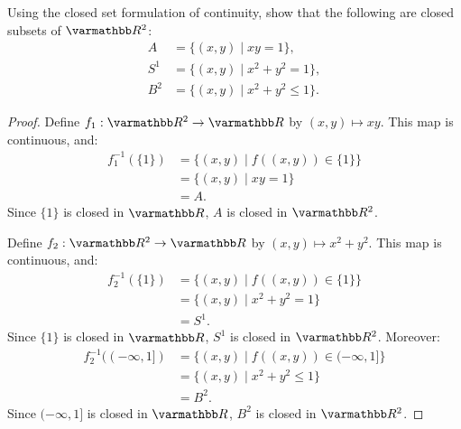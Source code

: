 \documentclass[12pt,twoside,openany]{memoir}
\begin{document}
\begin{exercise}[manual-num={10}]
Using the closed set formulation of continuity, show that the following are closed subsets of $\bfR^2$:
    \begin{equation*}
    \begin{split}
        A &= \{(x,y) \mid xy = 1\}, \\
        S^1 &= \{(x,y) \mid x^2 + y^2 = 1\}, \\
        B^2 &= \{(x,y) \mid x^2 + y^2 \leq 1\}.
    \end{split}
    \end{equation*}
\end{exercise}
    {\color{blue} \begin{proof}
        Define $f_1:\bfR^2 \rightarrow \bfR$ by $(x,y) \mapsto xy$. This map is continuous, and:
            \begin{equation*}
            \begin{split}
                f_1^{-1}(\{1\})
                & = \{(x,y) \mid f((x,y)) \in \{1\}\} \\
                & = \{(x,y) \mid xy = 1\} \\
                & = A.
            \end{split}
            \end{equation*}
        Since $\{1\}$ is closed in $\bfR$, $A$ is closed in $\bfR^2$.

        Define $f_2:\bfR^2 \rightarrow \bfR$ by $(x,y) \mapsto x^2 + y^2$. This map is continuous, and:
            \begin{equation*}
            \begin{split}
                f_2^{-1}(\{1\})
                & = \{(x,y) \mid f((x,y)) \in \{1\}\} \\
                & = \{(x,y) \mid x^2 + y^2 = 1\} \\
                & = S^1.
            \end{split}
            \end{equation*}
        Since $\{1\}$ is closed in $\bfR$, $S^1$ is closed in $\bfR^2$. Moreover:
            \begin{equation*}
            \begin{split}
                f_2^{-1}((-\infty,1]) 
                & = \{(x,y) \mid f((x,y)) \in (-\infty,1]\} \\
                & = \{(x,y) \mid x^2 + y^2 \leq 1\} \\
                & = B^2.
            \end{split}
            \end{equation*}
        Since $(-\infty,1]$ is closed in $\bfR$, $B^2$ is closed in $\bfR^2$.
    \end{proof}}
\end{document}
